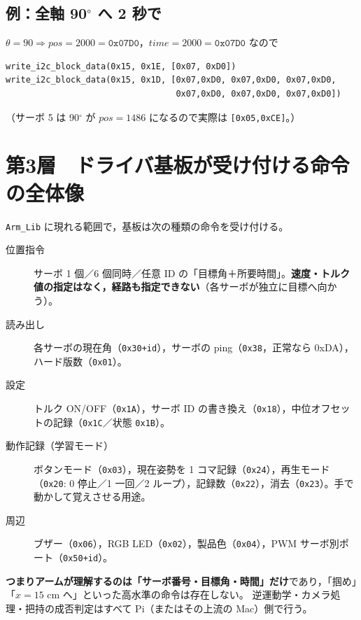 \documentclass[a4paper,11pt]{article}
\newcommand{\reg}[1]{\texttt{#1}}
\begin{document}
\subsection*{例：全軸 90$^\circ$ へ 2 秒で}
$\theta=90 \Rightarrow pos=2000=\reg{0x07D0}$，$time=2000=\reg{0x07D0}$ なので
\begin{lstlisting}
write_i2c_block_data(0x15, 0x1E, [0x07, 0xD0])
write_i2c_block_data(0x15, 0x1D, [0x07,0xD0, 0x07,0xD0, 0x07,0xD0,
                                  0x07,0xD0, 0x07,0xD0, 0x07,0xD0])
\end{lstlisting}
（サーボ 5 は 90$^\circ$ が $pos=1486$ になるので実際は \texttt{[0x05,0xCE]}。）

\section{第3層　ドライバ基板が受け付ける命令の全体像}

\texttt{Arm\_Lib} に現れる範囲で，基板は次の種類の命令を受け付ける。

\begin{description}
  \item[位置指令] サーボ 1 個／6 個同時／任意 ID の「目標角＋所要時間」。\textbf{速度・トルク値の指定はなく，経路も指定できない}（各サーボが独立に目標へ向かう）。
  \item[読み出し] 各サーボの現在角（\reg{0x30+id}），サーボの ping（\reg{0x38}，正常なら 0xDA），ハード版数（\reg{0x01}）。
  \item[設定] トルク ON/OFF（\reg{0x1A}），サーボ ID の書き換え（\reg{0x18}），中位オフセットの記録（\reg{0x1C}／状態 \reg{0x1B}）。
  \item[動作記録（学習モード）] ボタンモード（\reg{0x03}），現在姿勢を 1 コマ記録（\reg{0x24}），再生モード（\reg{0x20}: 0 停止／1 一回／2 ループ），記録数（\reg{0x22}），消去（\reg{0x23}）。手で動かして覚えさせる用途。
  \item[周辺] ブザー（\reg{0x06}），RGB LED（\reg{0x02}），製品色（\reg{0x04}），PWM サーボ別ポート（\reg{0x50+id}）。
\end{description}

\textbf{つまりアームが理解するのは「サーボ番号・目標角・時間」だけ}であり，「掴め」「$x=15$ cm へ」といった高水準の命令は存在しない。
逆運動学・カメラ処理・把持の成否判定はすべて Pi（またはその上流の Mac）側で行う。
\end{document}
